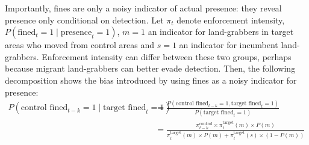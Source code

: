 \documentclass[12pt]{article}
\begin{document}
\quad Importantly, fines are only a noisy indicator of actual presence: they reveal presence only conditional on detection. Let $\pi_t$ denote enforcement intensity, $P(\text{fined}_t=1\mid\text{presence}_t=1)$, $m=1$ an indicator for land-grabbers in target areas who moved from control areas and $s=1$ an indicator for incumbent land-grabbers. Enforcement intensity can differ between these two groups, perhaps because migrant land-grabbers can better evade detection. Then, the following decomposition shows the bias introduced by using fines as a noisy indicator for presence:
\begin{align*}
P(\text{control fined}_{t-k} = 1 \mid \text{target fined}_t = 1)
&=\frac{P(\text{control fined}_{t-k} = 1, \text{target fined}_t = 1)}{P(\text{target fined}_t = 1)} \nonumber \\
&=
\frac{
\pi^{\text{control}}_{t-k} \times \pi^{\text{target}}_t(m) \times P(m)
}{
\pi^{\text{target}}_t(m) \times P(m)
+ \pi^{\text{target}}_t(s) \times (1 - P(m))
}
\end{align*} 
\ 
\end{document}
